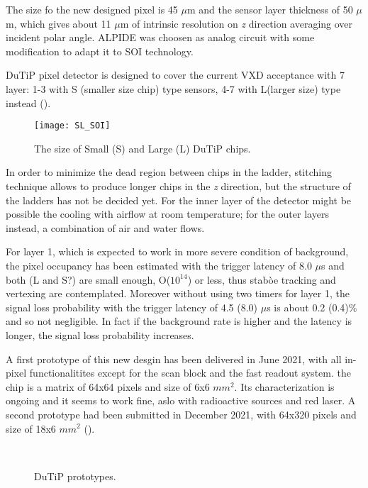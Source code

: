 The size fo the new designed pixel is 45 $\mu$m and the sensor layer thickness of 50 $\mu$m, which gives about 11 $\mu$m of intrinsic resolution on \textit{z} direction averaging over incident polar angle. ALPIDE was choosen as analog circuit with some modification to adapt it to SOI technology. 

DuTiP pixel detector is designed to cover the current VXD acceptance with 7 layer: 1-3 with S (smaller size chip) type sensors, 4-7 with L(larger size) type instead ().

\begin{figure}[h!]
\centering
\texttt{[image: SL\_SOI]}
\caption{The size of Small (S) and Large (L) DuTiP chips.}
\label{fig:SL_SOI}
\end{figure}

In order to minimize the dead region between chips in the ladder, stitching technique allows to produce longer chips in the \textit{z} direction, but the structure of the ladders has not be decided yet. For the inner layer of the detector might be possible the cooling with airflow at room temperature; for the outer layers instead, a combination of air and water flows.

For layer 1, which is expected to work in more severe condition of background, the pixel occupancy has been estimated with the trigger latency of 8.0 $\mu$s and both (L and S?) are small enough, O($10^{14}$) or less, thus stabòe tracking and vertexing are contemplated. Moreover without using two timers for layer 1, the signal loss probability with the trigger latency of 4.5 (8.0) $\mu$s is about 0.2 (0.4)\% and so not negligible. In fact if the background rate is higher and the latency is longer, the signal loss probability increases. 

A first prototype of this new desgin has been delivered in June 2021, with all in-pixel functionalitites except for the scan block and the fast readout system. the chip is a matrix of 64x64 pixels and size of 6x6 $mm^{2}$. Its characterization is ongoing and it seems to work fine, aslo with radioactive sources and red laser. A second prototype had been submitted in December 2021, with 64x320 pixels and size of 18x6 $mm^{2}$ (). 


\begin{figure}[h!]
\centering
{}\quad
{}\\
\caption{DuTiP prototypes.}
\label{fig:dutip_matrix}
\end{figure}



